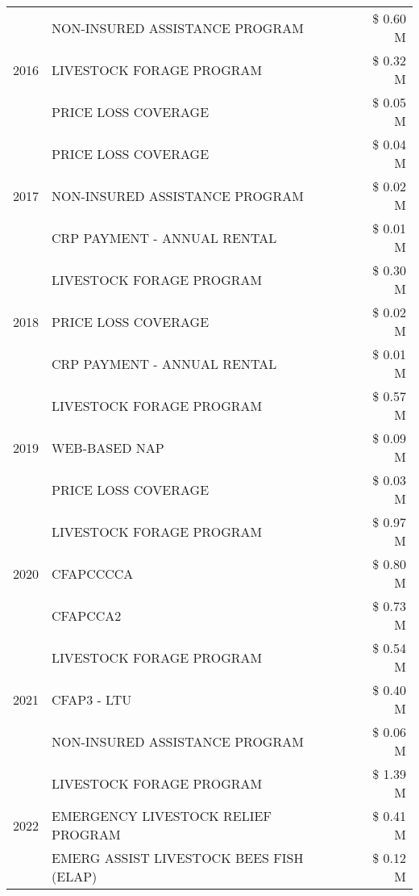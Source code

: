 \begin{tabular}{llr}
\cline{1-3}
\multirow[t]{3}{*}{2016} & NON-INSURED ASSISTANCE PROGRAM & \$ 0.60 M \\
 & LIVESTOCK FORAGE PROGRAM & \$ 0.32 M \\
 & PRICE LOSS COVERAGE & \$ 0.05 M \\
\cline{1-3}
\multirow[t]{3}{*}{2017} & PRICE LOSS COVERAGE & \$ 0.04 M \\
 & NON-INSURED ASSISTANCE PROGRAM & \$ 0.02 M \\
 & CRP PAYMENT - ANNUAL RENTAL & \$ 0.01 M \\
\cline{1-3}
\multirow[t]{3}{*}{2018} & LIVESTOCK FORAGE PROGRAM & \$ 0.30 M \\
 & PRICE LOSS COVERAGE & \$ 0.02 M \\
 & CRP PAYMENT - ANNUAL RENTAL & \$ 0.01 M \\
\cline{1-3}
\multirow[t]{3}{*}{2019} & LIVESTOCK FORAGE PROGRAM & \$ 0.57 M \\
 & WEB-BASED NAP & \$ 0.09 M \\
 & PRICE LOSS COVERAGE & \$ 0.03 M \\
\cline{1-3}
\multirow[t]{3}{*}{2020} & LIVESTOCK FORAGE PROGRAM & \$ 0.97 M \\
 & CFAPCCCCA & \$ 0.80 M \\
 & CFAPCCA2 & \$ 0.73 M \\
\cline{1-3}
\multirow[t]{3}{*}{2021} & LIVESTOCK FORAGE PROGRAM & \$ 0.54 M \\
 & CFAP3 - LTU & \$ 0.40 M \\
 & NON-INSURED ASSISTANCE PROGRAM & \$ 0.06 M \\
\cline{1-3}
\multirow[t]{3}{*}{2022} & LIVESTOCK FORAGE PROGRAM & \$ 1.39 M \\
 & EMERGENCY LIVESTOCK RELIEF PROGRAM & \$ 0.41 M \\
 & EMERG ASSIST LIVESTOCK BEES FISH (ELAP) & \$ 0.12 M \\
\cline{1-3}
\bottomrule
\end{tabular}
